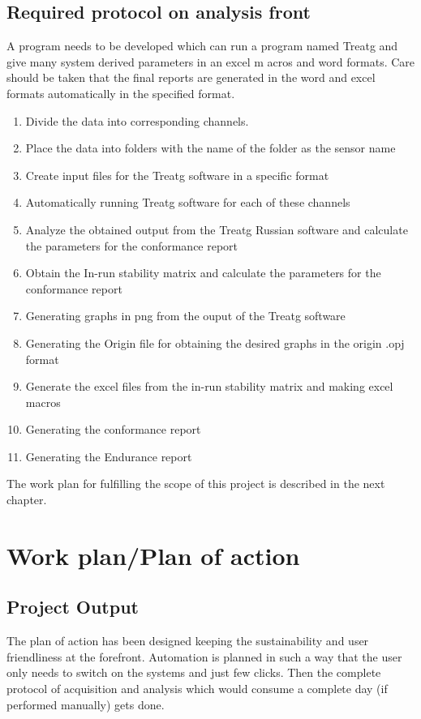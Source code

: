 \documentclass{FR16}
\begin{document}
\subsection{Required protocol on analysis front}
A program needs to be developed which can run a  program named Treatg and give many system derived parameters in an excel m
acros and word formats. Care should be taken that the final reports are generated in the word and excel formats automatically in the specified format.
 \begin{enumerate}
        \item Divide the data into corresponding channels.
        \item Place the data into folders with the name of the folder as the sensor name
        \item Create input files for the Treatg software in a specific format
        \item Automatically running Treatg software for each of these channels 
        \item Analyze the obtained output from the Treatg Russian software and calculate the parameters for the conformance report
        \item Obtain the In-run stability matrix and calculate the parameters for the conformance report
        \item Generating graphs in png from the ouput of the Treatg software
        \item Generating the Origin file for obtaining the desired graphs in the origin .opj format
        \item Generate the excel files from the in-run stability matrix and making excel macros
        \item Generating the conformance report
        \item Generating the Endurance report
    \end{enumerate}
 The work plan for fulfilling the scope of this project is described in the next chapter.      
\newpage
\section{Work plan/Plan of action}
\subsection{Project Output}
The plan of action has been designed keeping the sustainability and user friendliness at the forefront. Automation is planned in such a way that the user only needs to switch on the systems and just  few clicks. Then the complete protocol of acquisition and analysis which would consume a complete day (if performed manually) gets done.
\end{document}
